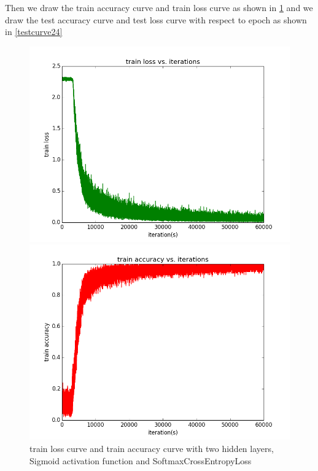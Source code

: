 \documentclass{elegantbook}
\begin{document}
Then we draw the train accuracy curve and train loss curve as shown in \ref{traincurve24} and we draw the test accuracy curve and test loss curve with respect to epoch as shown in \ref{testcurve24}
\begin{figure}[!ht]
	\centering
	\begin{minipage}[t]{0.45\textwidth}
		\centering
		\includegraphics[width=\textwidth]{trainloss2ss}
	\end{minipage}
	\begin{minipage}[t]{0.45\textwidth}
		\centering
		\includegraphics[width=\textwidth]{trainacc2ss}
	\end{minipage}
	\caption{\label{traincurve24}train loss curve and train accuracy curve with two hidden layers, Sigmoid activation function and SoftmaxCrossEntropyLoss}
\end{figure}
\end{document}
